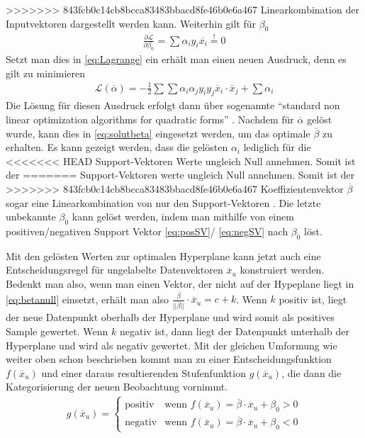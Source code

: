 \documentclass[
]{article}
\begin{document}
>>>>>>> 843fcb0c14cb8bcca83483bbacd8fe46b0e6a467
Linearkombination der Inputvektoren dargestellt werden kann. Weiterhin
gilt für \(\beta_0\) \begin{align}
\frac{\partial \mathcal{L}}{\partial \beta_0}=\sum \alpha_i y_i \overline{x_i}\overset{!}{=}0\label{eq:solutbeta0}
\end{align} Setzt man dies in \eqref{eq:Lagrange} ein erhält man einen
neuen Ausdruck, denn es gilt zu minimieren \begin{align}
\mathcal{L}(\overline \alpha)=-\frac{1}{2}\sum \sum \alpha_i \alpha_j y_i y_j \overline{x}_i \cdot \overline{x}_j+\sum \alpha_i\label{eq:dualproblem}
\end{align} Die Lösung für diesen Ausdruck erfolgt dann über sogenannte
\enquote{standard non linear optimization algorithms for quadratic forms}
\parencite{boserTrainingAlgorithmOptimal1992}. Nachdem für
\(\overline \alpha\) gelöst wurde, kann dies in \eqref{eq:solutbeta}
eingesetzt werden, um das optimale \(\overline{\beta}\) zu erhalten. Es
kann gezeigt werden, dass die gelösten \(\alpha_i\) lediglich für die
<<<<<<< HEAD
Support-Vektoren Werte ungleich Null annehmen. Somit ist der
=======
Support-Vektoren werte ungleich Null annehmen. Somit ist der
>>>>>>> 843fcb0c14cb8bcca83483bbacd8fe46b0e6a467
Koeffizientenvektor \(\overline{\beta}\) sogar eine Linearkombination
von nur den Support-Vektoren
\parencite{boserTrainingAlgorithmOptimal1992}. Die letzte unbekannte
\(\beta_0\) kann gelöst werden, indem man mithilfe von einem
positiven/negativen Support Vektor \eqref{eq:posSV}/ \eqref{eq:negSV}
nach \(\beta_0\) löst.

Mit den gelösten Werten zur optimalen Hyperplane kann jetzt auch eine
Entscheidungsregel für ungelabelte Datenvektoren \(\overline{x}_u\)
konstruiert werden. Bedenkt man also, wenn man einen Vektor, der nicht
auf der Hypeplane liegt in \eqref{eq:betanull} einsetzt, erhält man also
\(\frac{\overline \beta}{||\overline{\beta}||}\cdot \overline{x}_u=c+k\).
Wenn \(k\) positiv ist, liegt der neue Datenpunkt oberhalb der
Hyperplane und wird somit als positives Sample gewertet. Wenn \(k\)
negativ ist, dann liegt der Datenpunkt unterhalb der Hyperplane und wird
als negativ gewertet. Mit der gleichen Umformung wie weiter oben schon
beschrieben kommt man zu einer Entscheidungsfunktion
\(f(\overline{x}_u)\) und einer daraus resultierenden Stufenfunktion
\(g(\overline{x}_u)\), die dann die Kategorisierung der neuen
Beobachtung vornimmt. \begin{align}
g(\overline{x}_u)=\begin{cases}\mathrm{positiv}&\text{wenn } f(\overline{x}_u)=\overline{\beta}\cdot \overline{x}_u+\beta_0 > 0\\
\mathrm{negativ} & \text{wenn }f(\overline{x}_u)=\overline{\beta}\cdot \overline{x}_u+\beta_0<0
\end{cases}\label{eq:decisionf}
\end{align}
\end{document}
